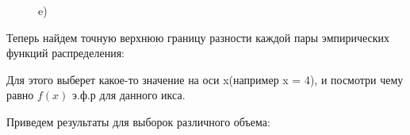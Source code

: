 \documentclass[a4paper,12pt, oneside]{book}
\begin{document}
\begin{figure}[p]
\begin{center}
\begin{minipage}[h!]{0.47\linewidth}
		\end{minipage}
		\hfill
		\begin{minipage}[h!]{0.47\linewidth}
			 e) \\
		\end{minipage}
	\end{center}
\end{figure}


Теперь найдем точную верхнюю границу разности каждой пары эмпирических функций распределения:

Для этого выберет какое-то значение на оси x(например x = 4), и посмотри чему равно $f(x)$ э.ф.р для данного икса.

Приведем результаты для выборок различного объема:
\vspace{5mm}
\end{document}
